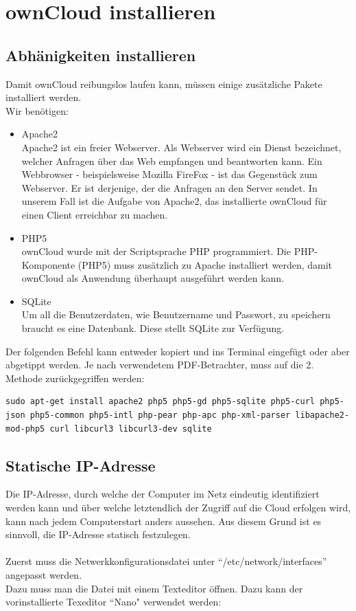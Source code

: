 \section{ownCloud installieren}

\subsection{Abhänigkeiten installieren}
Damit ownCloud reibungslos laufen kann, müssen einige zusätzliche Pakete installiert werden.
\\
Wir benötigen:

\begin{itemize}
\item Apache2 \\
Apache2 ist ein freier Webserver. Als Webserver wird ein Dienst bezeichnet, welcher Anfragen über das Web empfangen und beantworten kann. Ein Webbrowser - beispielsweise Mozilla FireFox - ist das Gegenstück zum Webserver. Er ist derjenige, der die Anfragen an den Server sendet. In unserem Fall ist die Aufgabe von Apache2, das installierte ownCloud für einen Client erreichbar zu machen.
\item PHP5 \\
ownCloud wurde mit der Scriptsprache PHP programmiert. Die PHP-Komponente (PHP5) muss zusätzlich zu Apache installiert werden, damit ownCloud als Anwendung überhaupt ausgeführt werden kann.
\item SQLite \\
Um all die Benutzerdaten, wie Benutzername und Passwort, zu speichern braucht es eine Datenbank. Diese stellt SQLite zur Verfügung.
\end{itemize}

Der folgenden Befehl kann entweder kopiert und ins Terminal eingefügt oder aber abgetippt werden. Je nach verwendetem PDF-Betrachter, muss auf die 2. Methode zurückgegriffen werden:

\begin{lstlisting}
sudo apt-get install apache2 php5 php5-gd php5-sqlite php5-curl php5-json php5-common php5-intl php-pear php-apc php-xml-parser libapache2-mod-php5 curl libcurl3 libcurl3-dev sqlite
\end{lstlisting}

\subsection{Statische IP-Adresse}
Die IP-Adresse, durch welche der Computer im Netz eindeutig identifiziert werden kann und über welche letztendlich der Zugriff auf die Cloud erfolgen wird, kann nach jedem Computerstart anders aussehen.
Aus diesem Grund ist es sinnvoll, die IP-Adresse statisch festzulegen.
\\
\\
Zuerst muss die Netwerkkonfigurationsdatei unter ``/etc/network/interfaces'' angepasst werden.
\\
Dazu muss man die Datei mit einem Texteditor öffnen. Dazu kann der vorinstallierte Texeditor ``Nano" verwendet werden: 

